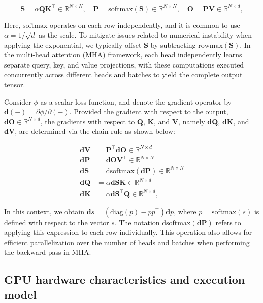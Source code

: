 \begin{equation*}
  \mathbf{S} = \alpha \mathbf{Q} \mathbf{K}^\top \in \mathbb{R}^{N \times N}, \quad \mathbf{P} = \mathrm{softmax}(\mathbf{S}) \in \mathbb{R}^{N \times N}, \quad \mathbf{O} = \mathbf{P}\mathbf{V} \in \mathbb{R}^{N \times d},
\end{equation*}

Here, $\mathrm{softmax}$ operates on each row independently, and it is common to use $\alpha = 1/\sqrt{d}$ as the scale. To mitigate issues related to numerical instability when applying the exponential, we typically offset $\mathbf{S}$ by subtracting $\mathrm{rowmax}(\mathbf{S})$. In the multi-head attention (MHA) framework, each head independently learns separate query, key, and value projections, with these computations executed concurrently across different heads and batches to yield the complete output tensor.

Consider $\phi$ as a scalar loss function, and denote the gradient operator by $\mathbf{d}(-) = \partial \phi / \partial (-)$. Provided the gradient with respect to the output, $\mathbf{dO} \in \mathbb{R}^{N \times d}$, the gradients with respect to $\mathbf{Q}$, $\mathbf{K}$, and $\mathbf{V}$, namely $\mathbf{dQ}$, $\mathbf{dK}$, and $\mathbf{dV}$, are determined via the chain rule as shown below:

\begin{align*}
  \mathbf{dV} &= \mathbf{P}^\top \mathbf{dO} \in \mathbb{R}^{N \times d} \\
  \mathbf{dP} &= \mathbf{dO} \mathbf{V}^\top \in \mathbb{R}^{N \times N} \\
  \mathbf{dS} &= \mathrm{dsoftmax} (\mathbf{dP}) \in \mathbb{R}^{N \times N} \\
  \mathbf{dQ} &= \alpha \mathbf{dS} \mathbf{K} \in \mathbb{R}^{N \times d} \\
  \mathbf{dK} &= \alpha \mathbf{dS}^\top \mathbf{Q} \in \mathbb{R}^{N \times d},
\end{align*}

In this context, we obtain $\mathbf{d}s = (\mathrm{diag}(p) - p p^\top)\mathbf{d}p$, where $p = \mathrm{softmax}(s)$ is defined with respect to the vector $s$. The notation $\mathrm{dsoftmax}(\mathbf{dP})$ refers to applying this expression to each row individually. This operation also allows for efficient parallelization over the number of heads and batches when performing the backward pass in MHA.

\subsection{GPU hardware characteristics and execution model}
\label{subsec:hardware}

